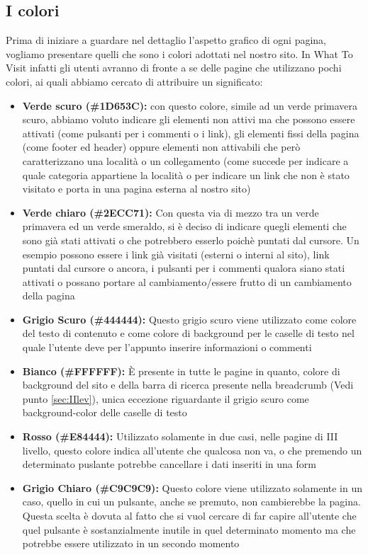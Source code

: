 \subsection{I colori}\label{sec:Pres-Colore}
Prima di iniziare a guardare nel dettaglio l'aspetto grafico di ogni pagina,
vogliamo presentare quelli che sono i colori adottati nel nostro sito. In What
To Visit infatti gli utenti avranno di fronte a se delle pagine che utilizzano
pochi colori, ai quali abbiamo cercato di attribuire un significato:
\begin{itemize}
\item \textbf{Verde scuro (\#1D653C):} con questo colore, simile ad un verde
primavera scuro, abbiamo voluto indicare gli elementi non attivi ma che
possono essere attivati (come pulsanti per i commenti o i link), gli elementi
fissi della pagina (come footer ed header) oppure elementi non attivabili che
però caratterizzano una località o un collegamento (come succede per indicare
a quale categoria appartiene la località o per indicare un link che non è
stato visitato e porta in una pagina esterna al nostro sito)
\item \textbf{Verde chiaro (\#2ECC71):} Con questa via di mezzo tra un verde
primavera ed un verde smeraldo, si è deciso di indicare quegli elementi che
sono già stati attivati o che potrebbero esserlo poichè puntati dal cursore.
Un esempio possono essere i link già visitati (esterni o interni al sito),
link puntati dal cursore o ancora, i pulsanti per i commenti qualora siano
stati attivati o possano portare al cambiamento/essere frutto di un
cambiamento della pagina
\item \textbf{Grigio Scuro (\#444444):} Questo grigio scuro viene utilizzato
come colore del testo di contenuto e come colore di background per le caselle
di testo nel quale l'utente deve per l'appunto inserire informazioni o commenti
\item \textbf{Bianco (\#FFFFFF):} È presente in tutte le pagine in quanto,
colore di background del sito e della barra di ricerca presente nella
breadcrumb (Vedi punto \ref{sec:IIlev}), unica eccezione riguardante il grigio
scuro come background-color delle caselle di testo
\item \textbf{Rosso (\#E84444):} Utilizzato solamente in due casi, nelle
pagine di III livello, questo colore indica all'utente che qualcosa non va, o
che premendo un determinato puslante potrebbe cancellare i dati inseriti in
una form
\item \textbf{Grigio Chiaro (\#C9C9C9):} Questo colore viene utilizzato
solamente in un caso, quello in cui un pulsante, anche se premuto, non
cambierebbe la pagina. Questa scelta è dovuta al fatto che si vuol cercare di
far capire all'utente che quel pulsante è sostanzialmente inutile in quel
determinato momento ma che potrebbe essere utilizzato in un secondo momento
\end{itemize}

